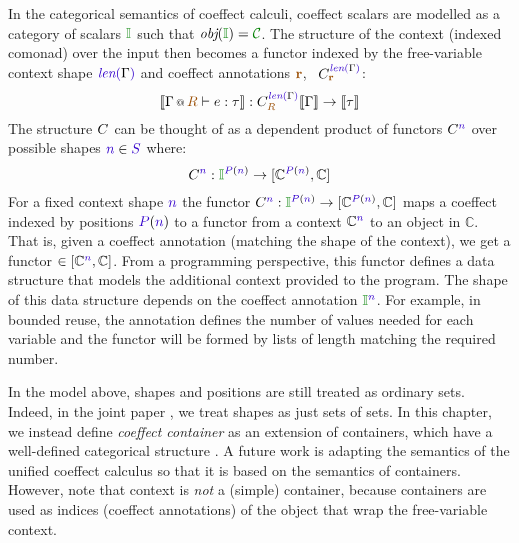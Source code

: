 \noindent
In the categorical semantics of coeffect calculi, coeffect scalars are modelled as a
category of scalars $\cclrd{\mathbb{I}}$ such that $\textit{obj}(\cclrd{\mathbb{I}}) = \C$.
The structure of the context (indexed comonad) over the input then becomes a functor
indexed by the free-variable context shape $\slen{\Gamma}$ and coeffect annotations
$\aclrd{\textbf{r}}$, \ie~$\ctyp{\slen{\Gamma}}_{\aclrd{\textbf{r}}}$:
%
\begin{equation*}
\sem{\coctx{\Gamma}{\aclrd{R}} \vdash e : \tau} : \ctyp{\slen{\Gamma}}_{\aclrd{R}}
\sem{\Gamma} \rightarrow \sem{\tau}
\end{equation*}
%
The structure $\ctyp{}$ can be thought of as a dependent product of functors $\ctyp{\sclrd{n}}$ 
over possible shapes $\sclrd{n} \in \SH$ where:
%
\begin{equation*}
\ctyp{\sclrd{n}} : \cclrd{\mathbb{I}}^{\SP(\sclrd{n})} \rightarrow [\mathbb{C}^{\SP(\sclrd{n})}, \mathbb{C}]
\end{equation*}
%
For a fixed context shape $\sclrd{n}$ the functor 
$\ctyp{\sclrd{n}} : \cclrd{\mathbb{I}}^{\SP(\sclrd{n})} \rightarrow [\mathbb{C}^{\SP(\sclrd{n})}, \mathbb{C}]$ 
maps a coeffect indexed by positions $\SP(\sclrd{n})$ to a functor from a context 
$\mathbb{C}^{\sclrd{n}}$ to an object in $\mathbb{C}$. That is, given a coeffect annotation 
(matching the shape of the context), we get a functor $\in [\mathbb{C}^{\sclrd{n}},\mathbb{C}]$. 
From a programming perspective, this functor defines a data structure that models the additional
context provided to the program. The shape of this data structure depends on the coeffect
annotation $\cclrd{\mathbb{I}}^{\sclrd{n}}$. For example, in bounded reuse, the annotation defines
the number of values needed for each variable and the functor will be 
formed by lists of length matching the required number. 

In the model above, shapes and positions are still treated as ordinary sets. Indeed, in the 
joint paper \cite{coeffects-icfp14}, we treat shapes as just sets of sets. In this chapter, we 
instead define \emph{coeffect container} as an extension of containers, which have a well-defined 
categorical structure \cite{semantics-containers}. A future work is adapting the semantics of
the unified coeffect calculus so that it is based on the semantics of containers. However, note 
that context is \emph{not} a (simple) container, because containers are used as indices (coeffect
annotations) of the object that wrap the free-variable context.



